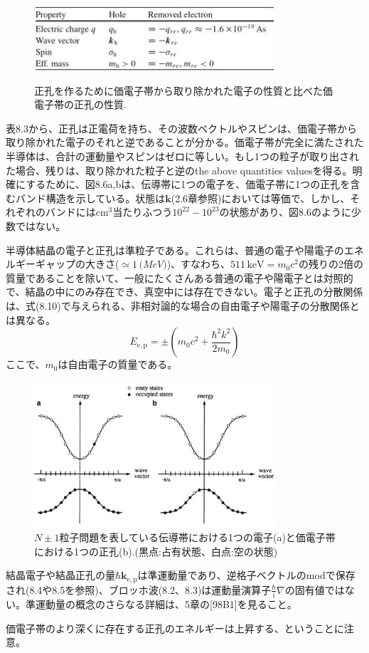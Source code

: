 \documentclass[11pt,a4j,uplatex]{jsarticle}
\begin{document}
\setcounter{figure}{2}
\begin{figure}[b]
  \centering
  \caption{正孔を作るために価電子帯から取り除かれた電子の性質と比べた価電子帯の正孔の性質.}
  \includegraphics[clip,width=9cm]{8_3.JPG}
  \label{table8.3}
\end{figure}

表8.3から、正孔は正電荷を持ち、その波数ベクトルやスピンは、価電子帯から取り除かれた電子のそれと逆であることが分かる。価電子帯が完全に満たされた半導体は、合計の運動量やスピンはゼロに等しい。もし1つの粒子が取り出された場合、残りは、取り除かれた粒子と逆のthe above quantities valuesを得る。明確にするために、図8.6a,bは、伝導帯に1つの電子を、価電子帯に1つの正孔を含むバンド構造を示している。状態は$\bm{k}$(2.6章参照)においては等価で、しかし、それぞれのバンドには$\mathrm{cm}^3$当たりふつう$10^{22}-10^{23}$の状態があり、図8.6のように少数ではない。

半導体結晶の電子と正孔は準粒子である。これらは、普通の電子や陽電子のエネルギーギャップの大きさ($\simeq1\,\mathrm(MeV)$)、すなわち、$511\,\mathrm{keV}=m_0c^2$の残りの2倍の質量であることを除いて、一般にたくさんある普通の電子や陽電子とは対照的で、結晶の中にのみ存在でき、真空中には存在できない。電子と正孔の分散関係は、式(8.10)で与えられる、非相対論的な場合の自由電子や陽電子の分散関係とは異なる。
\begin{equation}
  E_{\mathrm{e,p}}=\pm\left(m_0c^2+\frac{\hbar^2k^2}{2m_0}\right)
  \tag{8.10}
\end{equation}
ここで、$m_0$は自由電子の質量である。

\renewcommand{\figurename}{図}%
\setcounter{figure}{5}
\begin{figure}[tb]
  \centering
  \includegraphics[clip,width=9cm]{8_6.JPG}
  \caption{$N\pm1$粒子問題を表している伝導帯における1つの電子(a)と価電子帯における1つの正孔(b).(黒点:占有状態、白点:空の状態)}
  \label{8.6}
\end{figure}

結晶電子や結晶正孔の量$\hbar\bm{k}_{\mathrm{e,p}}$は準運動量であり、逆格子ベクトルのmodで保存され(8.4や8.5を参照)、ブロッホ波(8.2、8.3)は運動量演算子$\frac{\hbar}{\mathrm{i}}\nabla$の固有値ではない。準運動量の概念のさらなる詳細は、5章の[98B1]を見ること。

価電子帯のより深くに存在する正孔のエネルギーは上昇する、ということに注意。
\end{document}
